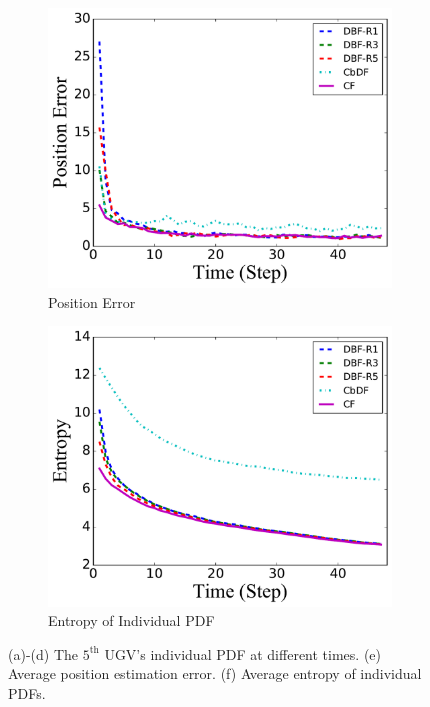 \documentclass[journal]{IEEEtranTIE}
\theoremstyle{remark}
\begin{document}
\begin{figure}
\begin{subfigure}{0.23\textwidth}
		\includegraphics[width=\textwidth]{figures/hetero_sta_sen_sta_tar_pos_err}
		\caption{Position Error}\label{fig:htr_sta_sen_sta_tar_pos_err}
	\end{subfigure}
	\begin{subfigure}{0.23\textwidth}%
		\includegraphics[width=\textwidth]{figures/hetero_sta_sen_sta_tar_entropy}
		\caption{Entropy of Individual PDF}\label{fig:htr_sta_sen_sta_tar_entropy}
	\end{subfigure}
	\caption{(a)-(d) The $5^\text{th}$ UGV's individual PDF at different times. (e) Average position estimation error. (f) Average entropy of individual PDFs.}
	\label{fig:htr_sta_sen_sta_tar}
\end{figure}
\end{document}

